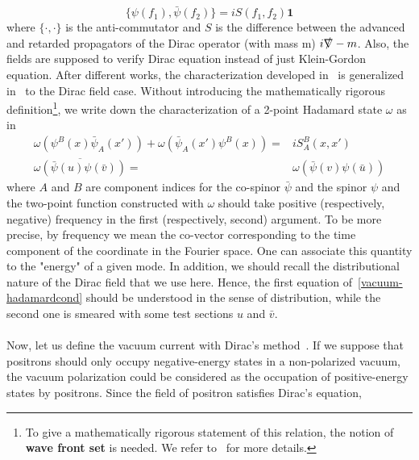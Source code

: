 \begin{equation*}
\{\psi(f_1), \bar{\psi}(f_2)\} = i S(f_1, f_2) \mathbf{1}
\end{equation*}
where $\{\cdot, \cdot\}$ is the anti-commutator and $S$ is the difference between the advanced and retarded propagators of the Dirac operator (with mass m) $i\slashed{\nabla} - m$.
Also, the fields are supposed to verify Dirac equation instead of just Klein-Gordon equation.
After different works, the characterization developed in~\cite{Radzikowski1996} is generalized in~\cite{Sahlmann2000} to the Dirac field case.
Without introducing the mathematically rigorous definition\footnote{
To give a mathematically rigorous statement of this relation, 
the notion of \textbf{wave front set} is needed. 
We refer to~\cite{Radzikowski1996} for more details.
}, 
we write down the characterization of a 2-point Hadamard state $\omega$ as in~\cite{Zahn2015}
\begin{equation}\label{vacuum-hadamardcond}
\begin{split}
\omega(\psi^B(x)\bar{\psi}_A(x')) + \omega(\bar{\psi}_A(x')\psi^B(x)) = &
iS^B_A(x,x') \\
\overline{\omega(\bar{\psi}(u)\psi(\bar{v}))} = & \omega(\bar{\psi}(v)\psi(\bar{u}))
\end{split}
\end{equation}
where $A$ and $B$ are component indices for the co-spinor $\bar{\psi}$ and the spinor $\psi$ and the two-point function constructed with $\omega$ should take positive (respectively, negative) frequency in the first (respectively, second) argument.
To be more precise, 
by frequency we mean the co-vector corresponding to the time component of the coordinate in the Fourier space.
One can associate this quantity to the "energy" of a given mode. 
In addition, we should recall the distributional nature of the Dirac field that we use here. 
Hence, the first equation of~\cref{vacuum-hadamardcond} should be understood in the sense of distribution,
while the second one is smeared with some test sections $u$ and $\bar{v}$. \\\\
Now, let us define the vacuum current with Dirac's method~\cite{Dirac1934}.
If we suppose that positrons should only occupy negative-energy states in a non-polarized vacuum, 
the vacuum polarization could be considered as the occupation of positive-energy states by positrons. 
Since the field of positron satisfies Dirac's equation, 
